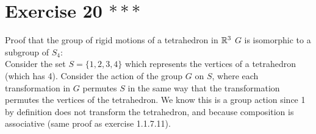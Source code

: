 \documentclass{article}
\begin{document}
    \section*{Exercise 20 $***$}
    Proof that the group of rigid motions of a tetrahedron in $\mathbb{R}^3$ $G$
    is isomorphic to a subgroup of $S_4$: \\
    Consider the set $S = \{1, 2, 3 ,4\}$ which represents the vertices of
    a tetrahedron (which has 4).
    Consider the action of the group $G$ on $S$,
    where each transformation in $G$ permutes $S$ in the same way that
    the transformation permutes the vertices of the tetrahedron.
    We know this is a group action since 1 by definition does not transform 
    the tetrahedron,
    and because composition is associative
    (same proof as exercise 1.1.7.11). \\
\end{document}
